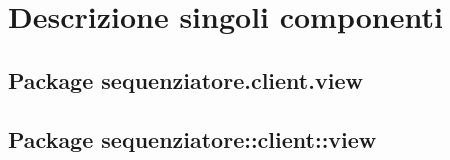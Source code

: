 \section{Descrizione singoli componenti}
\subsection{Package sequenziatore.client.view}



\subsection{Package sequenziatore::client::view}

